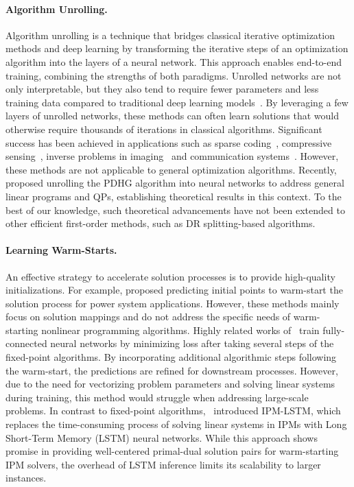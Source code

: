 \documentclass[10pt]{article} %
\begin{document}
\paragraph{Algorithm Unrolling.}
Algorithm unrolling is a technique that bridges classical iterative optimization methods and deep learning by transforming the iterative steps of an optimization algorithm into the layers of a neural network. This approach enables end-to-end training, combining the strengths of both paradigms. Unrolled networks are not only interpretable, but they also tend to require fewer parameters and less training data compared to traditional deep learning models~\citep{monga2021algorithm}.
By leveraging a few layers of unrolled networks, these methods can often learn solutions that would otherwise require thousands of iterations in classical algorithms.
Significant success has been achieved in applications such as sparse coding~\citep{gregor2010ista}, compressive sensing~\citep{sun2016deep}, inverse problems in imaging~\citep{aljadaany2019douglas,liu2020learnable,su2024transformer} and communication systems~\citep{sun2023douglas}.
However, these methods are not applicable to general optimization algorithms.
Recently,~\citet{lipdhg, yang2024efficient} proposed unrolling the PDHG algorithm into neural networks to address general linear programs and QPs, establishing theoretical results in this context. 
To the best of our knowledge, such theoretical advancements have not been extended to other efficient first-order methods, such as DR splitting-based algorithms.

\paragraph{Learning Warm-Starts.} 
An effective strategy to accelerate solution processes is to provide high-quality initializations. 
For example, \citet{baker2019learning, diehl2019warm, zhang2022learning} proposed predicting initial points to warm-start the solution process for power system applications. However, these methods mainly focus on solution mappings and do not address the specific needs of warm-starting nonlinear programming algorithms.
Highly related works of~\citet{sambharya2023end,sambharya2024learning} train fully-connected neural networks by minimizing loss after taking several steps of the fixed-point algorithms. 
By incorporating additional algorithmic steps following the warm-start, the predictions are refined for downstream processes. 
However, due to the need for vectorizing problem parameters and solving linear systems during training, this method would struggle when addressing large-scale problems.
In contrast to fixed-point algorithms,~\citet{gao2024ipm} introduced IPM-LSTM, which replaces the time-consuming process of solving linear systems in IPMs with Long Short-Term Memory (LSTM) neural networks. 
While this approach shows promise in providing well-centered primal-dual solution pairs for warm-starting IPM solvers, the overhead of LSTM inference limits its scalability to larger instances.
\end{document}
